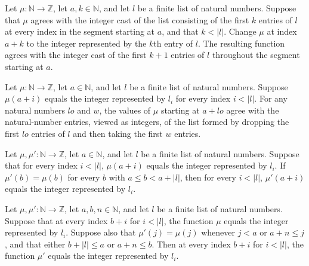 \begin{theorem}
\label{Light.SegN.take_succ}
\leanok
{}
Let $\mu:\mathbb{N}\to\mathbb{Z}$, let $a,k\in\mathbb{N}$, and let $l$ be a finite list
of natural numbers. Suppose that $\mu$ agrees with the integer cast of the list
consisting of the first $k$ entries of $l$ at every index in the segment starting at
$a$, and that $k<|l|$. Change $\mu$ at index $a+k$ to the integer represented by the
$k$th entry of $l$. The resulting function agrees with the integer cast of the first
$k+1$ entries of $l$ throughout the segment starting at $a$.
\end{theorem}

\begin{theorem}
\label{Light.SegN.drop_take}
\leanok
{}
Let $\mu : \mathbb{N}\to\mathbb{Z}$, let $a\in\mathbb{N}$, and let $l$ be a finite list
of natural numbers. Suppose $\mu(a+i)$ equals the integer represented by $l_i$ for every
index $i<|l|$. For any natural numbers $lo$ and $w$, the values of $\mu$ starting at
$a+lo$ agree with the natural-number entries, viewed as integers, of the list formed by
dropping the first $lo$ entries of $l$ and then taking the first $w$ entries.
\end{theorem}

\begin{theorem}
\label{Light.SegN.keep}
\leanok
{}
Let $\mu,\mu':\mathbb{N}\to\mathbb{Z}$, let $a\in\mathbb{N}$, and let $l$ be a finite
list of natural numbers. Suppose that for every index $i<|l|$, $\mu(a+i)$ equals the
integer represented by $l_i$. If $\mu'(b)=\mu(b)$ for every $b$ with $a\le b<a+|l|$,
then for every $i<|l|$, $\mu'(a+i)$ equals the integer represented by $l_i$.
\end{theorem}

\begin{theorem}
\label{Light.SegN.of_sameOutside}
\leanok
{}
Let $\mu,\mu':\mathbb{N}\to\mathbb{Z}$, let $a,b,n\in\mathbb{N}$, and let $l$ be a
finite list of natural numbers. Suppose that at every index $b+i$ for $i<|l|$, the
function $\mu$ equals the integer represented by $l_i$. Suppose also that
$\mu'(j)=\mu(j)$ whenever $j<a$ or $a+n\le j$, and that either $b+|l|\le a$ or $a+n\le
b$. Then at every index $b+i$ for $i<|l|$, the function $\mu'$ equals the integer
represented by $l_i$.
\end{theorem}


